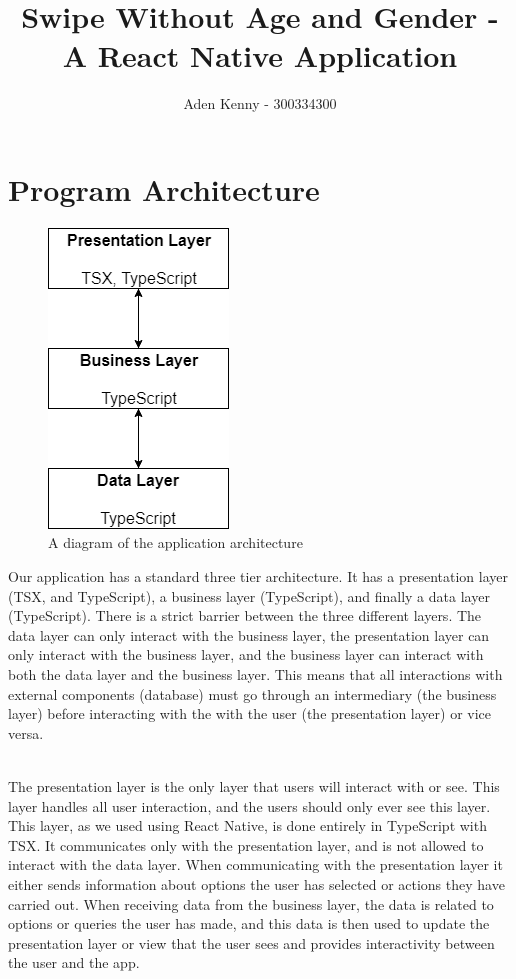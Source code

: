 \documentclass[a4paper, 11pt]{article}
\begin{document}
\title{Swipe Without Age and Gender - A React Native Application}

\author{
Aden Kenny - 300334300
}

\maketitle

\section{Program Architecture}

\begin{figure}
\centering
\captionsetup{format=hang}
\includegraphics{architecture.png}
\caption{A diagram of the application architecture}
\end{figure}

Our application has a standard three tier architecture. It has a presentation layer (TSX, and TypeScript), a business layer (TypeScript), and finally a data layer (TypeScript). There is a strict barrier between the three different layers. The data layer can only interact with the business layer, the presentation layer can only interact with the business layer, and the business layer can interact with both the data layer and the business layer. This means that all interactions with external components (database) must go through an intermediary (the business layer) before interacting with the with the user (the presentation layer) or vice versa.

~\\
The presentation layer is the only layer that users will interact with or see. This layer handles all user interaction, and the users should only ever see this layer. This layer, as we used using React Native, is done entirely in TypeScript with TSX. It communicates only with the presentation layer, and is not allowed to interact with the data layer. When communicating with the presentation layer it either sends information about options the user has selected or actions they have carried out. When receiving data from the business layer, the data is related to options or queries the user has made, and this data is then used to update the presentation layer or view that the user sees and provides interactivity between the user and the app.
\end{document}
